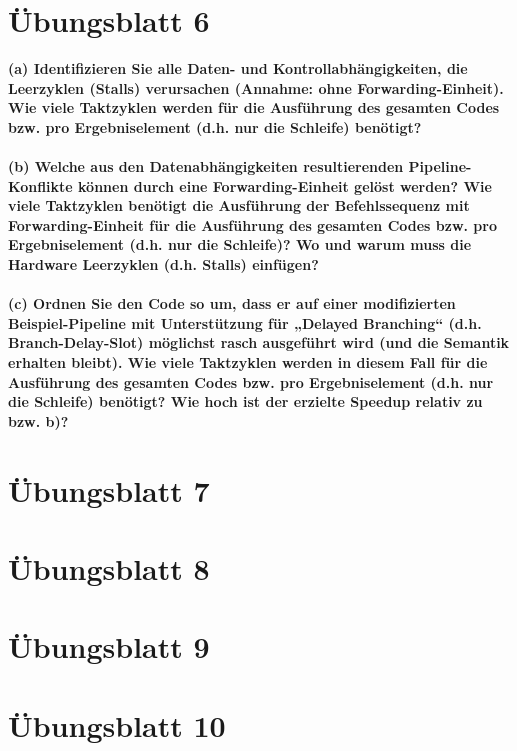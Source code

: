 \documentclass[11pt]{article}
\begin{document}
\section{Übungsblatt 6}
    \textbf{(a) Identifizieren Sie alle Daten- und Kontrollabhängigkeiten, die Leerzyklen (Stalls)
    verursachen (Annahme: ohne Forwarding-Einheit). Wie viele Taktzyklen werden für die
    Ausführung des gesamten Codes bzw. pro Ergebniselement (d.h. nur die Schleife)
    benötigt?\\\\
    (b) Welche aus den Datenabhängigkeiten resultierenden Pipeline-Konflikte können durch
    eine Forwarding-Einheit gelöst werden? Wie viele Taktzyklen benötigt die Ausführung der
    Befehlssequenz mit Forwarding-Einheit für die Ausführung des gesamten Codes bzw. pro
    Ergebniselement (d.h. nur die Schleife)? Wo und warum muss die Hardware Leerzyklen
    (d.h. Stalls) einfügen?\\\\
    (c) Ordnen Sie den Code so um, dass er auf einer modifizierten Beispiel-Pipeline mit
    Unterstützung für „Delayed Branching“ (d.h. Branch-Delay-Slot) möglichst rasch
    ausgeführt wird (und die Semantik erhalten bleibt). Wie viele Taktzyklen werden in diesem
    Fall für die Ausführung des gesamten Codes bzw. pro Ergebniselement (d.h. nur die
    Schleife) benötigt? Wie hoch ist der erzielte Speedup relativ zu bzw. b)?}

	


\section{Übungsblatt 7}


\section{Übungsblatt 8}



\section{Übungsblatt 9}


\section{Übungsblatt 10}

    
\end{document}
